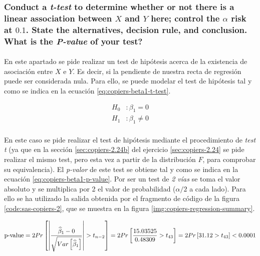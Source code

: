 \documentclass{article}
\begin{document}
      \subsubsection{Conduct a \emph{t-test} to determine whether or not there is a linear association between $X$ and $Y$ here; control the $\alpha$ risk at $0.1$. State the alternatives, decision rule, and conclusion. What is the \emph{P-value} of your test?}
      \label{sec:copiers-2.5b}

        \paragraph{}
        En este apartado se pide realizar un test de hipótesis acerca de la existencia de asociación entre $X$ e $Y$. Es decir, si la pendiente de nuestra recta de regresión puede ser considerada nula. Para ello, se puede modelar el test de hipótesis tal y como se indica en la ecuación \eqref{eq:copiers-beta1-t-test}.

        \begin{equation}
        \label{eq:copiers-beta1-t-test}
          \begin{split}
            H_0&: \beta_1 = 0 \\
            H_1&: \beta_1 \neq 0
          \end{split}
        \end{equation}

        \paragraph{}
        En este caso se pide realizar el test de hipótesis mediante el procedimiento de \emph{test t} (ya que en la sección \ref{sec:copiers-2.24b} del ejercicio \ref{sec:copiers-2.24} se pide realizar el mismo test, pero esta vez a partir de la distribución $F$, para comprobar su equivalencia). El \emph{p-valor} de este test se obtiene tal y como se indica en la ecuación \eqref{eq:copiers-beta1-p-value}. Por ser un test de \emph{2 vías} se toma el valor absoluto y se multiplica por 2 el valor de probabilidad ($\alpha/2$ a cada lado). Para ello se ha utilizado la salida obtenida por el fragmento de código de la figura \ref{code:sas-copiers-2}, que se muestra en la figura \ref{img:copiers-regression-summary}.

        \begin{equation}
        \label{eq:copiers-beta1-p-value}
          \text{p-value}
          = 2Pr\left[\left|\frac{\widehat{\beta}_1 - 0}{\sqrt{Var\left[\widehat{\beta}_1\right]}}\right| > t_{n-2}\right]
          = 2Pr\left[\frac{15.03525}{0.48309} > t_{43}\right]
          = 2Pr\left[31.12 > t_{43}\right]
          < 0.0001
        \end{equation}
\end{document}
